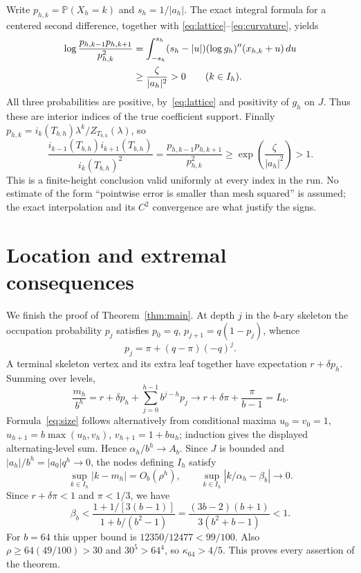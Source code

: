 \documentclass[11pt]{article}
\newcommand{\Pp}{\mathbb P}
\begin{document}
Write $p_{h,k}=\Pp(X_h=k)$ and $s_h=1/|a_h|$. The exact integral
formula for a centered second difference, together with
\eqref{eq:lattice}--\eqref{eq:curvature}, yields
\begin{align}
 \log\frac{p_{h,k-1}p_{h,k+1}}{p_{h,k}^2}
 &=\int_{-s_h}^{s_h}(s_h-|u|)(\log g_h)''(x_{h,k}+u)\,du\notag\\
 &\ge\frac{\zeta}{|a_h|^2}>0\qquad(k\in I_h).\label{eq:finitecurvature}
\end{align}
All three probabilities are positive, by~\eqref{eq:lattice} and
positivity of $g_h$ on $J$. Thus these are interior indices of the true
coefficient support. Finally
$p_{h,k}=i_k(T_{b,h})\lambda^k/Z_{T_{b,h}}(\lambda)$, so
\begin{equation}\label{eq:transfer}
 \frac{i_{k-1}(T_{b,h})i_{k+1}(T_{b,h})}{i_k(T_{b,h})^2}
 =\frac{p_{h,k-1}p_{h,k+1}}{p_{h,k}^2}
 \ge\exp\left(\frac{\zeta}{|a_h|^2}\right)>1.
\end{equation}
This is a finite-height conclusion valid uniformly at every index in the
run. No estimate of the form ``pointwise error is smaller than mesh
squared'' is assumed; the exact interpolation and its $C^2$ convergence
are what justify the signs.

\section{Location and extremal consequences}
We finish the proof of Theorem~\ref{thm:main}. At depth $j$ in the
$b$-ary skeleton the occupation probability $p_j$ satisfies
$p_0=q$, $p_{j+1}=q(1-p_j)$, whence
\[
 p_j=\pi+(q-\pi)(-q)^j.
\]
A terminal skeleton vertex and its extra leaf together have expectation
$r+\delta p_h$. Summing over levels,
\[
 \frac{m_h}{b^h}=r+\delta p_h+\sum_{j=0}^{h-1}b^{j-h}p_j
 \longrightarrow r+\delta\pi+\frac{\pi}{b-1}=L_b.
\]
Formula~\eqref{eq:size} follows alternatively from conditional maxima
$u_0=v_0=1$, $u_{h+1}=b\max(u_h,v_h)$, $v_{h+1}=1+bu_h$;
induction gives the displayed alternating-level sum. Hence
$\alpha_h/b^h\to A_b$. Since $J$ is bounded and
$|a_h|/b^h=|a_0|q^h\to0$, the nodes defining $I_h$ satisfy
\[
 \sup_{k\in I_h}|k-m_h|=O_b(\rho^h),\qquad
 \sup_{k\in I_h}\left|k/\alpha_h-\beta_b\right|\to0.
\]
Since $r+\delta\pi<1$ and $\pi<1/3$, we have
\[
 \beta_b<\frac{1+1/[3(b-1)]}{1+b/(b^2-1)}
 =\frac{(3b-2)(b+1)}{3(b^2+b-1)}<1.
\]
For $b=64$ this upper bound is $12350/12477<99/100$.
Also $\rho\ge64(49/100)>30$ and $30^5>64^4$, so
$\kappa_{64}>4/5$. This proves every assertion of the theorem.
\end{document}
